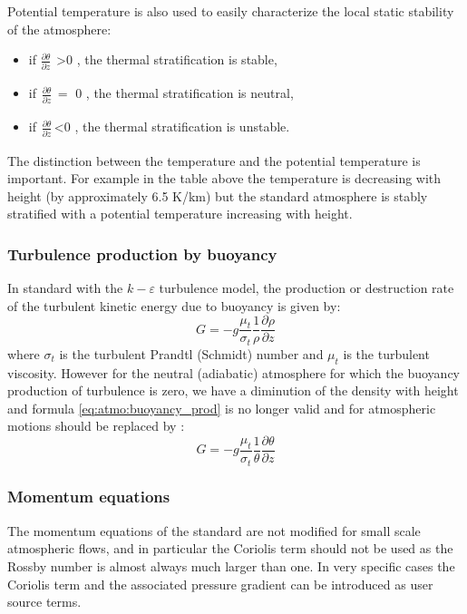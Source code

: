 Potential temperature is also used to easily characterize the local static
stability of the atmosphere:
\begin{itemize}
  \item if $\frac{\partial \theta }{\partial z}_{\, \, \, }$\textgreater 0 , the
    thermal stratification is stable,
  \item if$_{\, \, \, }\frac{\partial \theta }{\partial z}_{\, }=$ 0 , the
    thermal stratification is neutral,
  \item if$_{\, \, \, }\frac{\partial \theta }{\partial z}_{\, }$\textless 0 ,
    the thermal stratification is unstable.
\end{itemize}

The distinction between the temperature and the potential temperature is
important. For example in the table above the temperature is decreasing with
height (by approximately 6.5 K/km) but the standard atmosphere is stably
stratified with a potential temperature increasing with height.


\subsubsection{Turbulence production by buoyancy}
In standard \CS with the $k-\varepsilon$ turbulence model, the production or destruction rate of the turbulent kinetic energy due to buoyancy is given by:
\begin{equation}
\label{eq:atmo:buoyancy_prod}
G=-g \frac{\mu_{t} }{\sigma_{t} }\frac{1}{\rho }\frac{\partial \rho
}{\partial z}
\end{equation}
where $\sigma_{t}$ is the turbulent Prandtl (Schmidt) number and $\mu_{t}$ is the turbulent viscosity.
However for the neutral (adiabatic) atmosphere for which the buoyancy
production of turbulence is zero, we have a diminution of the density with
height and formula \eqref{eq:atmo:buoyancy_prod} is no longer valid and for atmospheric motions should
be replaced by \cite{Stull:1988}:
\begin{equation}
\label{eq:atmo:eq4}
G=-g \frac{\mu_{t}}{\sigma_{t} }\frac{1}{\theta }\frac{\partial \theta
}{\partial z}
\end{equation}

\subsubsection{ Momentum equations }
The momentum equations of the standard \CS are not
modified for small scale atmospheric flows, and in particular the Coriolis
term should not be used as the Rossby number is almost always much larger
than one. In very specific cases the Coriolis term and the associated
pressure gradient can be introduced as user source terms.

